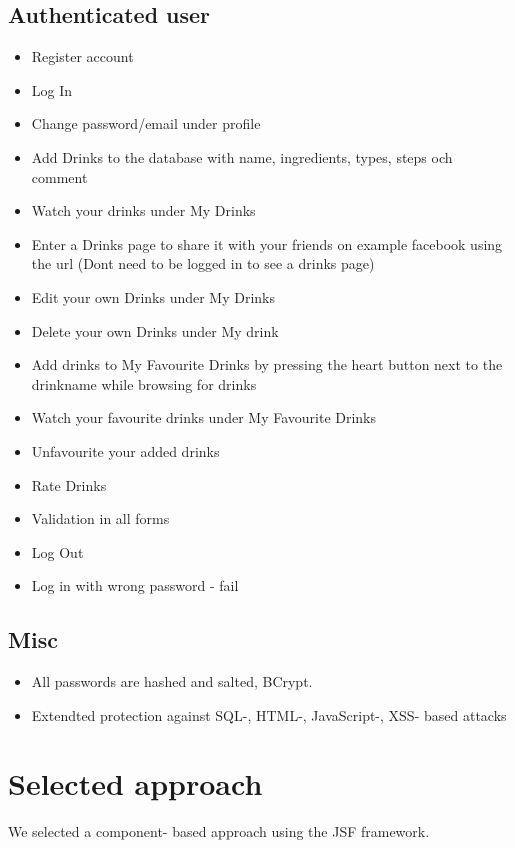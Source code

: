 \documentclass[a4paper]{article}
\begin{document}
\subsection{Authenticated user}

\begin{itemize}
\item Register account
\item Log In
\item Change password/email under profile
\item Add Drinks to the database with name, ingredients, types, steps och comment
\item Watch your drinks under My Drinks
\item Enter a Drinks page to share it with your friends on example facebook using the url (Dont need to be logged in to see a drinks page)
\item Edit your own Drinks under My Drinks
\item Delete your own Drinks under My drink
\item Add drinks to My Favourite Drinks by pressing the heart button next to the drinkname while browsing for drinks
\item Watch your favourite drinks under My Favourite Drinks
\item Unfavourite your added drinks
\item Rate Drinks
\item Validation in all forms
\item Log Out
\item Log in with wrong password - fail
\end{itemize}

\subsection{Misc}

\begin{itemize}
\item All passwords are hashed and salted, BCrypt.
\item Extendted protection against SQL-, HTML-, JavaScript-, XSS- based attacks
\end{itemize}

\section{Selected approach}
We selected a component- based approach using the JSF framework.
\end{document}
